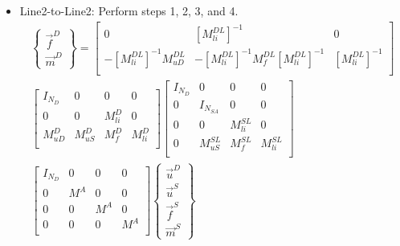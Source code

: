 \documentclass[10pt,letterpaper,oneside,notitlepage]{article}
\begin{document}
\begin{itemize}
  \item Line2-to-Line2: Perform steps 1, 2, 3, and 4.
			\begin{multline}
				\left\{	\begin{matrix} \vec{f}^{D} \\ \vec{m}^{D} \end{matrix} \right\} 
			  =
				\begin{bmatrix}
				0 							 & \left[ M_{li}^{DL} \right]^{-1} & 0   \\
				-\left[ M_{li}^{DL} \right]^{-1} M_{uD}^{DL} & 
				-\left[ M_{li}^{DL} \right]^{-1} M_{f}^{DL} \left[ M_{li}^{DL} \right]^{-1}  &
				 \left[ M_{li}^{DL} \right]^{-1} \\
				\end{bmatrix}						
				\\											
			  \begin{bmatrix}
				I_{N_D}					 & 0  								 & 0          & 0          \\
				0 							 & 0  								 & M_{li}^{D} & 0          \\
				M_{uD}^{D} 		   & M_{uS}^{D}    		   & M_{f}^{D}  & M_{li}^{D} \\
				\end{bmatrix}				
				\begin{bmatrix}
				I_{N_D}					 & 0  								 & 0           & 0           \\
				0                & I_{\mathit{N_{SA}}} & 0   				 & 0   			 	 \\
				0								 & 0  								 & M_{li}^{SL} & 0   				 \\
				0							   & M_{uS}^{SL}    		 & M_{f}^{SL}  & M_{li}^{SL} \\
				\end{bmatrix}
				\\				
				\begin{bmatrix}
				I_{\mathit{N_D}} & 0   & 0   & 0   \\
				0 							 & M^A & 0   & 0   \\
				0 							 & 0   & M^A & 0   \\
				0								 & 0   & 0   & M^A \\
				\end{bmatrix}
				\left\{	\begin{matrix} \vec{u}^D \\ \vec{u}^{S}  \\ \vec{f}^{S}  \\ \vec{m}^{S} \end{matrix} \right\} 				

\end{multline}
\end{itemize}
\end{document}
